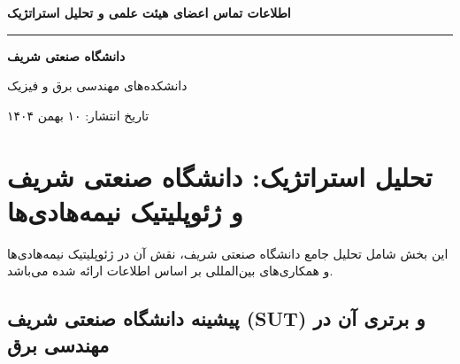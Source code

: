 \documentclass[10pt]{report}
\newcommand{\lat}[1]{\lr{#1}}
\begin{document}
\thispagestyle{empty}
\begin{center}
\vspace*{2cm}

{\Huge\bfseries\color{headerColor} اطلاعات تماس اعضای هیئت علمی و تحلیل استراتژیک}

\vspace{0.6cm}
{\color{gray}\rule{0.7\textwidth}{0.75pt}}
\vspace{0.6cm}

{\Large\bfseries دانشگاه صنعتی شریف}

\vspace{0.2cm}
{\large دانشکده‌های مهندسی برق و فیزیک}

\vspace{1.5cm}


\vfill
{\small\color{gray} تاریخ انتشار: ۱۰ بهمن ۱۴۰۴}
\end{center}

\clearpage
\tableofcontents

\clearpage
\chapter{تحلیل استراتژیک: دانشگاه صنعتی شریف و ژئوپلیتیک نیمه‌هادی‌ها}

\begin{keyconceptbox}
این بخش شامل تحلیل جامع دانشگاه صنعتی شریف، نقش آن در ژئوپلیتیک نیمه‌هادی‌ها و همکاری‌های بین‌المللی بر اساس اطلاعات ارائه شده می‌باشد.
\end{keyconceptbox}

\section{پیشینه دانشگاه صنعتی شریف (SUT) و برتری آن در مهندسی برق}
\end{document}
